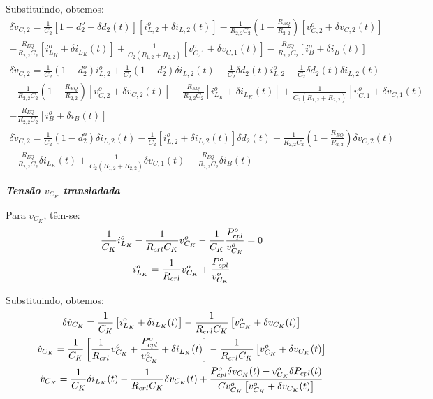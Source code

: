 Substituindo, obtemos:
\begin{multline*}
  \delta \dot v_{C,2} = \frac{1}{C_2} \left[1 - d_2^o - \delta d_2(t)\right] \left[i_{L,2}^o + \delta i_{L,2}(t)\right]
  - \frac{1}{R_{2,2}C_2} \left(1 - \frac{R_{EQ}}{R_{2,2}}\right) \left[v_{C,2}^o + \delta v_{C,2}(t)\right] \\
  - \frac{R_{EQ}}{R_{2,2} C_2} \left[i_{L_K}^o + \delta i_{L_K}(t)\right] + \frac{1}{C_2(R_{1,2} + R_{2,2})} \left[v_{C,1}^o + \delta v_{C,1}(t)\right] - \frac{R_{EQ}}{R_{2,2} C_2} \left[i_B^o + \delta i_B(t)\right]
\end{multline*}
\begin{multline*}
  \delta \dot v_{C,2} = \frac{1}{C_2} (1 - d_2^o) i_{L,2}^o + \frac{1}{C_2} (1 - d_2^o) \delta i_{L,2}(t) - \frac{1}{C_2} \delta d_2(t) i_{L,2}^o - \frac{1}{C_2} \delta d_2(t) \delta i_{L,2}(t)\\
  - \frac{1}{R_{2,2}C_2} \left(1 - \frac{R_{EQ}}{R_{2,2}}\right) \left[v_{C,2}^o + \delta v_{C,2}(t)\right]
  - \frac{R_{EQ}}{R_{2,2} C_2} \left[i_{L_K}^o + \delta i_{L_K}(t)\right] + \frac{1}{C_2(R_{1,2} + R_{2,2})} \left[v_{C,1}^o + \delta v_{C,1}(t)\right] \\
  - \frac{R_{EQ}}{R_{2,2} C_2} \left[i_B^o + \delta i_B(t)\right]
\end{multline*}
\begin{multline*}
  \delta \dot v_{C,2} = \frac{1}{C_2} (1 - d_2^o) \delta i_{L,2}(t) - \frac{1}{C_2} \left[i_{L,2}^o + \delta i_{L,2}(t)\right] \delta d_2(t)
  - \frac{1}{R_{2,2}C_2} \left(1 - \frac{R_{EQ}}{R_{2,2}}\right) \delta v_{C,2}(t)  \\
  - \frac{R_{EQ}}{R_{2,2} C_2} \delta i_{L_K}(t) + \frac{1}{C_2(R_{1,2} + R_{2,2})}  \delta v_{C,1}(t) - \frac{R_{EQ}}{R_{2,2} C_2} \delta i_B(t)
\end{multline*}


\textbf{\textit{Tensão $v_{C_K}$ transladada}} \vspace*{12pt}

Para $\dot{v}_{C_K}$, têm-se:
\begin{gather*}
  \frac{1}{C_K} i_{L_K}^o - \frac{1}{R_{crl} C_K} v_{C_K}^o - \frac{1}{C_K} \frac{P_{cpl}^o}{v_{C_K}^o} = 0 \nle
  i_{L_K}^o = \frac{1}{R_{crl}} v_{C_K}^o + \frac{P_{cpl}^o}{v_{C_K}^o}
\end{gather*}

Substituindo, obtemos:
\begin{gather*}
  \delta \dot{v}_{C_K} = \frac{1}{C_K} \left[i_{L_K}^o + \delta i_{L_K}(t)\right]
  - \frac{1}{R_{crl} C_K} \left[v_{C_K}^o + \delta v_{C_K}(t)\right] \nle
  \dot{v}_{C_K} = \frac{1}{C_K} \left[\frac{1}{R_{crl}} v_{C_K}^o + \frac{P_{cpl}^o}{v_{C_K}^o} + \delta i_{L_K}(t)\right]
  - \frac{1}{R_{crl} C_K} \left[v_{C_K}^o + \delta v_{C_K}(t)\right] \nle
  \dot{v}_{C_K} = \frac{1}{C_K} \delta i_{L_K}(t)
  - \frac{1}{R_{crl} C_K} \delta v_{C_K}(t)
  + \frac{P_{cpl}^o \delta v_{C_K}(t) - v_{C_K}^o \delta P_{cpl}(t)}{Cv_{C_K}^o\left[v_{C_K}^o + \delta v_{C_K}(t)\right]}
\end{gather*}

